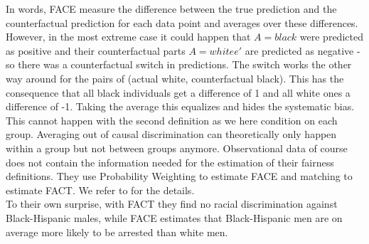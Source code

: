 In words, FACE measure the difference between the true prediction and the counterfactual prediction for each data point and averages over these differences. However, in the most extreme case it could happen that $A = black$ were predicted as positive and their counterfactual parts $A = whitee'$ are predicted as negative - so there was a counterfactual switch in predictions. The switch works the other way around for the pairs of (actual white, counterfactual black). This has the consequence that all black individuals get a difference of 1 and all white ones a difference of -1. Taking the average this equalizes and hides the systematic bias.
This cannot happen with the second definition as we here condition on each group. Averaging out of causal discrimination can theoretically only happen within a group but not between groups anymore. Observational data of course does not contain the information needed for the estimation of their fairness definitions. They use Probability Weighting to estimate FACE and matching to estimate FACT. We refer to \cite{Khademi2019FADMELC} for the details.\\
To their own surprise, with FACT they find no racial discrimination against Black-Hispanic males, while FACE estimates that Black-Hispanic men are on average more likely to be arrested than white men.






